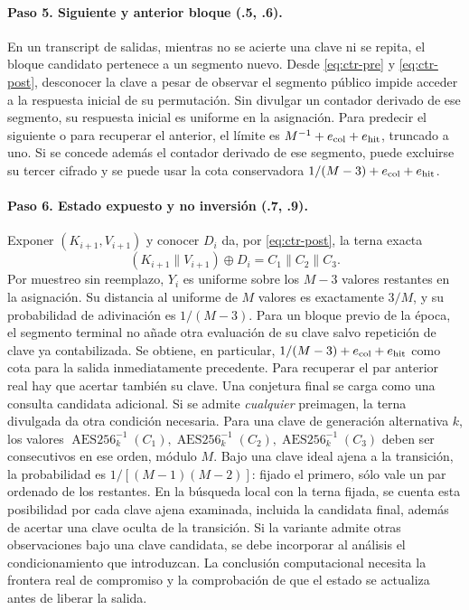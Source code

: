 \documentclass[11pt,a4paper]{article}
\newcommand{\AES}{\operatorname{AES256}}
\begin{document}
\paragraph{Paso 5. Siguiente y anterior bloque (.5, .6).}
En un transcript de salidas, mientras no se acierte una
clave ni se repita, el bloque candidato pertenece a un
segmento nuevo. Desde \eqref{eq:ctr-pre} y \eqref{eq:ctr-post},
desconocer la clave a pesar de observar el segmento público
impide acceder a la respuesta inicial de su permutación.
Sin divulgar un contador derivado de ese segmento, su
respuesta inicial es uniforme en la asignación. Para
predecir el siguiente o para recuperar el anterior, el
límite es \(M^{-1}+e_{\rm col}+e_{\rm hit}\), truncado a uno.
Si se concede además el contador derivado de ese segmento,
puede excluirse su tercer cifrado y se puede usar
la cota conservadora \(1/(M-3)+e_{\rm col}+e_{\rm hit}\).

\paragraph{Paso 6. Estado expuesto y no inversión (.7, .9).}
Exponer \((K_{i+1},V_{i+1})\) y conocer \(D_i\) da, por
\eqref{eq:ctr-post}, la terna exacta
\[
 (K_{i+1}\|V_{i+1})\oplus D_i=C_1\|C_2\|C_3.
\]
Por muestreo sin reemplazo, \(Y_i\) es uniforme sobre
los \(M-3\) valores restantes en la asignación. Su
distancia al uniforme de \(M\) valores es exactamente
\(3/M\), y su probabilidad de adivinación es
\(1/(M-3)\). Para un bloque previo de la época, el
segmento terminal no añade otra evaluación de su clave
salvo repetición de clave ya contabilizada. Se obtiene,
en particular, \(1/(M-3)+e_{\rm col}+e_{\rm hit}\)
como cota para la salida inmediatamente precedente.
Para recuperar el par anterior real hay que acertar también
su clave. Una conjetura final se carga como una consulta
candidata adicional. Si se admite \emph{cualquier} preimagen,
la terna divulgada da otra condición necesaria. Para una
clave de generación alternativa \(k\), los valores
\(\AES_k^{-1}(C_1),\AES_k^{-1}(C_2),\AES_k^{-1}(C_3)\)
deben ser consecutivos en ese orden, módulo \(M\). Bajo
una clave ideal ajena a la transición, la probabilidad es
\(1/[(M-1)(M-2)]\): fijado el primero, sólo vale un par
ordenado de los restantes. En la búsqueda local con la
terna fijada, se cuenta esta posibilidad por cada clave
ajena examinada, incluida la candidata final, además de
acertar una clave oculta de la transición. Si la variante
admite otras observaciones bajo una clave candidata, se
debe incorporar al análisis el condicionamiento que
introduzcan. La conclusión computacional necesita
la frontera real de compromiso y la comprobación de
que el estado se actualiza antes de liberar la salida.
\end{document}
